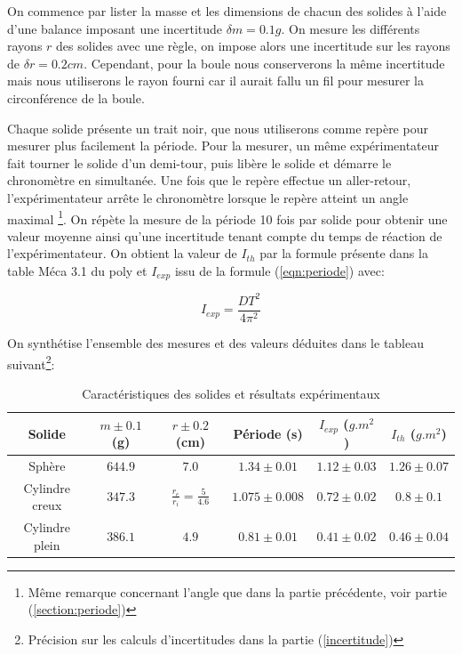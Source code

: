 \documentclass[12pt]{article}
\begin{document}
On commence par lister la masse et les dimensions de chacun des solides à l'aide d'une balance imposant une incertitude $\delta m = 0.1g$.
On mesure les différents rayons $r$ des solides avec une règle, on impose alors une incertitude sur les rayons de $\delta r = 0.2cm$. Cependant, pour la boule nous conserverons
la même incertitude mais nous utiliserons le rayon fourni car il aurait fallu un fil pour mesurer la circonférence de la boule.

Chaque solide présente un trait noir, que nous utiliserons comme repère pour mesurer plus facilement la période. Pour la mesurer,
un même expérimentateur fait tourner le solide d'un demi-tour, puis libère le solide et démarre le chronomètre en simultanée. 
Une fois que le repère effectue un aller-retour, l'expérimentateur arrête le chronomètre lorsque 
le repère atteint un angle maximal \footnote{Même remarque concernant l'angle que dans la partie précédente, voir partie (\ref{section:periode})}.
On répète la mesure de la période 10 fois par solide pour obtenir une valeur moyenne ainsi qu'une incertitude tenant compte du temps de réaction
de l'expérimentateur. On obtient la valeur de $I_{th}$ par la formule présente dans la table Méca 3.1 du poly et $I_{exp}$ issu de la formule (\ref{eqn:periode}) avec:

\begin{equation}
    I_{exp} = \frac{DT^2}{4\pi^2} 
\end{equation}

On synthétise l'ensemble des mesures et des valeurs déduites dans le tableau suivant\footnote{Précision sur les calculs d'incertitudes dans la partie (\ref{incertitude})}:

\begin{table}[h!]
	\centering
	\begin{tabular}{||c c c c c c||} 
		\hline
		Solide          & $m \pm 0.1$ (g)  & $r \pm 0.2$ (cm)  & Période (s) & $I_{exp}$ ($g.m^2$)& $I_{th}$ ($g.m^2$)\\
		\hline
        Sphère          & $644.9$ & $7.0$ & $1.34 \pm 0.01$ & $1.12 \pm 0.03$ & $1.26 \pm 0.07$\\
        Cylindre creux  & $347.3$ & $\frac{r_e}{r_i} = \frac{5}{4.6}$ & $1.075 \pm 0.008$ & $0.72 \pm 0.02$ & $0.8 \pm 0.1$ \\
        Cylindre plein  & $386.1$ & $4.9$ & $0.81 \pm 0.01$ & $0.41 \pm 0.02$ & $0.46 \pm 0.04$\\
		\hline
	\end{tabular}
	\caption{Caractéristiques des solides et résultats expérimentaux}
	\label{table:1}
\end{table}
\end{document}
